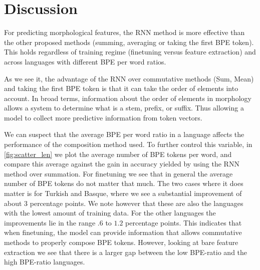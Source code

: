 \documentclass[11pt]{article}
\newcommand\adam[1]{(\textbf{Adam:} #1)}
\begin{document}
	\section{Discussion}

        For predicting morphological features, the RNN method is more
     effective than the other proposed methods (summing, averaging or
     taking the first BPE token). This holds regardless of training
     regime (finetuning versus feature extraction) and across
     languages with different BPE per word ratios.
    
                 As we see it, the advantage of the RNN over
     commutative methods (Sum, Mean) and taking the first BPE token is
     that it can take the order of elements into account. In broad
     terms, information about the order of elements in morphology
     allows a system to determine what is a stem, prefix, or suffix.
      Thus allowing a model to collect more predictive information
     from token vectors.

             We can suspect that the average BPE per word ratio in a
     language affects the performance of the composition method
     used. To further control this variable, in \cref{fig:scatter_len}
     we plot the average number of BPE tokens per word, and compare
     this average against the gain in accuracy yielded by using the
     RNN method over summation.  For finetuning we see that in
     general the average number of BPE tokens do not matter that
     much. The two cases where it does matter is for Turkish and
     Basque, where we see a substantial improvement of about $3$
     percentage points. We note however that these are also the
     languages with the lowest amount of training data.
        For the other languages the improvements lie in the range $.6$
     to $1.2$ percentage points. This indicates that when finetuning,
     the model can provide information that allows commutative methods
     to properly compose BPE tokens. However, looking at bare feature
     extraction we see that there is a larger gap between the low
     BPE-ratio and the high BPE-ratio languages.
\end{document}
